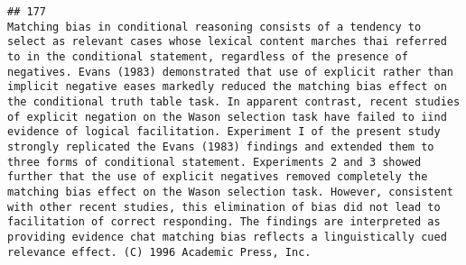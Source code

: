 \documentclass[
  english,
  man]{apa6}
\begin{document}
\begin{verbatim}
## 177                                                                                                                                                                                                                                                                                                                                                                                                                                                                                                                                                                                                                                                                                                                                                                                                                                                                                                                                                                                                                                                                                                                                                                                                                                                                                                                                                                                                                                                                                                                                                                 Matching bias in conditional reasoning consists of a tendency to select as relevant cases whose lexical content marches thai referred to in the conditional statement, regardless of the presence of negatives. Evans (1983) demonstrated that use of explicit rather than implicit negative eases markedly reduced the matching bias effect on the conditional truth table task. In apparent contrast, recent studies of explicit negation on the Wason selection task have failed to iind evidence of logical facilitation. Experiment I of the present study strongly replicated the Evans (1983) findings and extended them to three forms of conditional statement. Experiments 2 and 3 showed further that the use of explicit negatives removed completely the matching bias effect on the Wason selection task. However, consistent with other recent studies, this elimination of bias did not lead to facilitation of correct responding. The findings are interpreted as providing evidence chat matching bias reflects a linguistically cued relevance effect. (C) 1996 Academic Press, Inc.

\end{verbatim}
\end{document}
